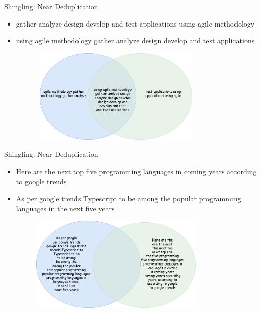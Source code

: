 \documentclass[9pt]{beamer}
\begin{document}
\begin{frame}{Shingling: Near Deduplication}
  \begin{itemize}
  \item gather analyze design develop and test applications using agile methodology
  \item using agile methodology gather analyze design develop and test applications
  \end{itemize}
  \pause
  \begin{figure}
    \includegraphics[width=9.5cm,height=4.5cm]{img/shinglesintersect1.png}
  \end{figure}
\end{frame}


\begin{frame}{Shingling: Near Deduplication}
  \begin{itemize}
  \item Here are the next top five programming languages in coming years according to google trends
  \item As per google trends Typescript to be among the popular programming languages in the next five years
  \end{itemize}
  \pause
  \begin{figure}
    \includegraphics[width=9.5cm,height=4.5cm]{img/shinglesintersect2.png}
  \end{figure}
\end{frame}

\end{document}
